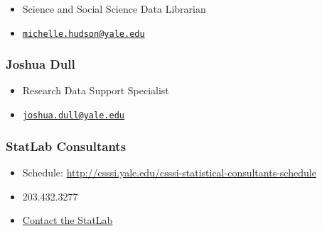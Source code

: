 \begin{itemize}
\tightlist
\item
  Science and Social Science Data Librarian
\item
  \href{mailto:michelle.hudson@yale.edu}{\nolinkurl{michelle.hudson@yale.edu}}
\end{itemize}

\subsubsection{Joshua Dull}\label{joshua-dull}

\begin{itemize}
\tightlist
\item
  Research Data Support Specialist
\item
  \href{mailto:joshua.dull@yale.edu}{\nolinkurl{joshua.dull@yale.edu}}
\end{itemize}

\subsubsection{StatLab Consultants}\label{statlab-consultants}

\begin{itemize}
\tightlist
\item
  Schedule:
  \url{http://csssi.yale.edu/csssi-statistical-consultants-schedule}
\item
  203.432.3277
\item
  \href{http://csssi.yale.edu/data-and-gis/statlab-consulting/contact-statlab}{Contact
  the StatLab}
\end{itemize}

